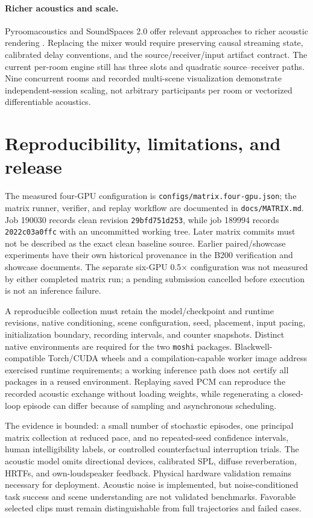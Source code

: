\documentclass{article}
\newcommand{\code}[1]{\texttt{#1}}
\begin{document}
\paragraph{Richer acoustics and scale.} Pyroomacoustics and SoundSpaces 2.0 offer relevant approaches to richer acoustic rendering \citep{scheibler2017pyroomacoustics,chen2022soundspaces}. Replacing the mixer would require preserving causal streaming state, calibrated delay conventions, and the source/receiver/input artifact contract. The current per-room engine still has three slots and quadratic source--receiver paths. Nine concurrent rooms and recorded multi-scene visualization demonstrate independent-session scaling, not arbitrary participants per room or vectorized differentiable acoustics.

\section{Reproducibility, limitations, and release}
The measured four-GPU configuration is \code{configs/matrix.four-gpu.json}; the matrix runner, verifier, and replay workflow are documented in \code{docs/MATRIX.md}. Job 190030 records clean revision \code{29bfd751d253}, while job 189994 records \code{2022c03a0ffc} with an uncommitted working tree. Later matrix commits must not be described as the exact clean baseline source. Earlier paired/showcase experiments have their own historical provenance in the B200 verification and showcase documents. The separate six-GPU 0.5$\times$ configuration was not measured by either completed matrix run; a pending submission cancelled before execution is not an inference failure.

A reproducible collection must retain the model/checkpoint and runtime revisions, native conditioning, scene configuration, seed, placement, input pacing, initialization boundary, recording intervals, and counter snapshots. Distinct native environments are required for the two \code{moshi} packages. Blackwell-compatible Torch/CUDA wheels and a compilation-capable worker image address exercised runtime requirements; a working inference path does not certify all packages in a reused environment. Replaying saved PCM can reproduce the recorded acoustic exchange without loading weights, while regenerating a closed-loop episode can differ because of sampling and asynchronous scheduling.

The evidence is bounded: a small number of stochastic episodes, one principal matrix collection at reduced pace, and no repeated-seed confidence intervals, human intelligibility labels, or controlled counterfactual interruption trials. The acoustic model omits directional devices, calibrated SPL, diffuse reverberation, HRTFs, and own-loudspeaker feedback. Physical hardware validation remains necessary for deployment. Acoustic noise is implemented, but noise-conditioned task success and scene understanding are not validated benchmarks. Favorable selected clips must remain distinguishable from full trajectories and failed cases.
\end{document}
